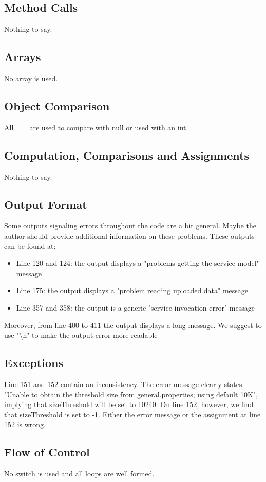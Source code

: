 \documentclass{article}
\begin{document}
\subsection{Method Calls}
Nothing to say.
\subsection{Arrays}
No array is used.
\subsection{Object Comparison}
All == are used to compare with null or used with an int.
\subsection{Computation, Comparisons and Assignments}
Nothing to say.
\subsection{Output Format}
Some outputs signaling errors throughout the code are a bit general. Maybe the author should provide additional information on these problems. These outputs can be found at:
\begin{itemize}[noitemsep]
\item Line 120 and 124: the output displays a "problems getting the service model" message
\item Line 175: the output displays a "problem reading uploaded data" message
\item Line 357 and 358: the output is a generic "service invocation error" message
\end{itemize}
Moreover, from line 400 to 411 the output displays a long message. We suggest to use "\textbackslash n" to make the output error more readable
\subsection{Exceptions}
Line 151 and 152 contain an inconsistency. The error message clearly states "Unable to obtain the threshold size from general.properties; using default 10K", implying that sizeThreshold will be set to 10240. On line 152, however, we find that sizeThreshold is set to -1. Either the error message or the assignment at line 152 is wrong.\\
\subsection{Flow of Control}
No switch is used and all loops are well formed.
\end{document}
